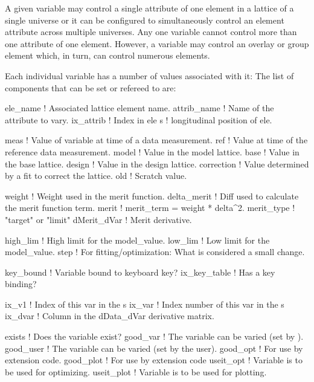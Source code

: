 A given variable may control a single attribute of one element in a
 lattice of a single universe or it can be configured to
simultaneously control an element attribute across multiple
universes. Any one variable cannot control more than one attribute of
one element. However, a variable may control an overlay or group
element which, in turn, can control numerous elements.

Each individual variable has a number of values associated with it:
The list of components that can be set or refereed to are:
\begin{example}
  ele_name     ! Associated lattice element name.
  attrib_name  ! Name of the attribute to vary.
  ix_attrib    ! Index in ele%
  s            ! longitudinal position of ele.

  meas         ! Value of variable at time of a data measurement.
  ref          ! Value at time of the reference data measurement.
  model        ! Value in the model lattice.
  base         ! Value in the base lattice.
  design       ! Value in  the design lattice.
  correction   ! Value determined by a fit to correct the lattice.
  old          ! Scratch value.

  weight       ! Weight used in the merit function.
  delta_merit  ! Diff used to calculate the merit function term.
  merit        ! merit_term = weight * delta^2.
  merit_type   ! "target" or "limit"
  dMerit_dVar  ! Merit derivative.

  high_lim     ! High limit for the model_value.
  low_lim      ! Low limit for the model_value.
  step         ! For fitting/optimization: What is considered a small change.

  key_bound    ! Variable bound to keyboard key?
  ix_key_table ! Has a key binding?

  ix_v1        ! Index of this var in the s%
  ix_var       ! Index number of this var in the s%
  ix_dvar      ! Column in the dData_dVar derivative matrix.

  exists       ! Does the variable exist?
  good_var     ! The variable can be varied (set by \tao).
  good_user    ! The variable can be varied (set by the user).
  good_opt     ! For use by extension code.
  good_plot    ! For use by extension code
  useit_opt    ! Variable is to be used for optimizing.
  useit_plot   ! Variable is to be used for plotting.
\end{example}


